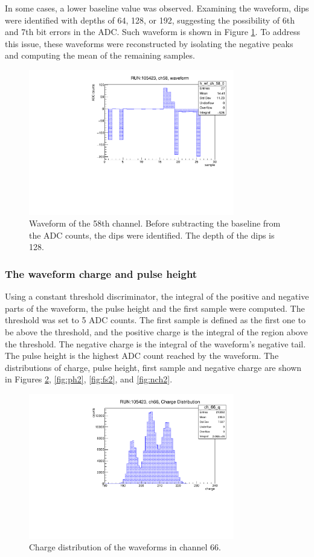 In some cases, a lower baseline value was observed. Examining the waveform, dips were identified with depths of 64, 128, or 192, 
suggesting the possibility of 6th and 7th bit errors in the ADC. Such waveform is shown in Figure \ref{fig:dips}. 
To address this issue, these waveforms were reconstructed by isolating the negative peaks and computing the mean of the remaining samples.
\begin{figure}[!h]
  \centering
  \includegraphics[width=0.8\textwidth]{figures/pdf/wf_ch58_1.pdf}
  \caption{Waveform of the 58th channel. Before subtracting the baseline from the ADC counts, the dips were identified. The depth of the dips is 128.}
 \label{fig:dips}
\end{figure}
\subsubsection{The waveform charge and pulse height}\label{threshold}
Using a constant threshold discriminator, the integral of the positive and negative parts of the waveform, 
the pulse height and the first sample were computed. The threshold was set to 5 ADC counts. 
The first sample is defined as the first one to be above the threshold, and the positive charge 
is the integral of the region above the threshold. The negative charge is the integral of the waveform's 
negative tail. The pulse height is the highest ADC count reached by the waveform. The distributions of 
charge, pulse height, first sample and negative charge are shown in Figures \ref{fig:ch1}, \ref{fig:ph2}, \ref{fig:fs2}, and \ref{fig:nch2}.
\begin{figure}[!h]
      \centering
      \includegraphics[width=0.8\textwidth]{figures/pdf/charge.pdf}
      \caption{Charge distribution of the waveforms in channel 66.}
      \label{fig:ch1}
  \end{figure}

